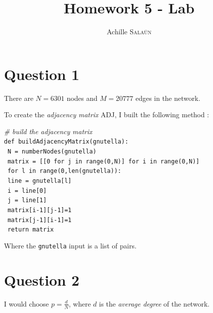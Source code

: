 \documentclass[a4paper]{report}
\title{Homework 5 - Lab}
\author{Achille \textsc{Sala\"{u}n}}
\begin{document}
\maketitle

\section*{Question 1}
There are $N=6301$ nodes and $M=20777$ edges in the network.
\medbreak

To create the \textit{adjacency matrix} ADJ, I built the following method : 

\medbreak
\noindent     \textit{\# build the adjacency matrix}\\
\noindent     \texttt{def buildAdjacencyMatrix(gnutella):}\\
\hspace*{1cm} \texttt{	N = numberNodes(gnutella)}\\
\hspace*{1cm} \texttt{	matrix = [[0 for j in range(0,N)] for i in range(0,N)]}\\
\hspace*{1cm} \texttt{	for l in range(0,len(gnutella)):}\\
\hspace*{2cm} \texttt{			line = gnutella[l]}\\
\hspace*{2cm} \texttt{			i = line[0]}\\
\hspace*{2cm} \texttt{			j = line[1]}\\
\hspace*{2cm} \texttt{			matrix[i-1][j-1]=1}\\
\hspace*{2cm} \texttt{			matrix[j-1][i-1]=1}\\
\hspace*{1cm} \texttt{	return matrix}\\
\medbreak

Where the \texttt{gnutella} input is a list of pairs.

\section*{Question 2}
I would choose $p = \frac{d}{N}$, where $d$ is the \textit{average degree} of the network.

\end{document}
